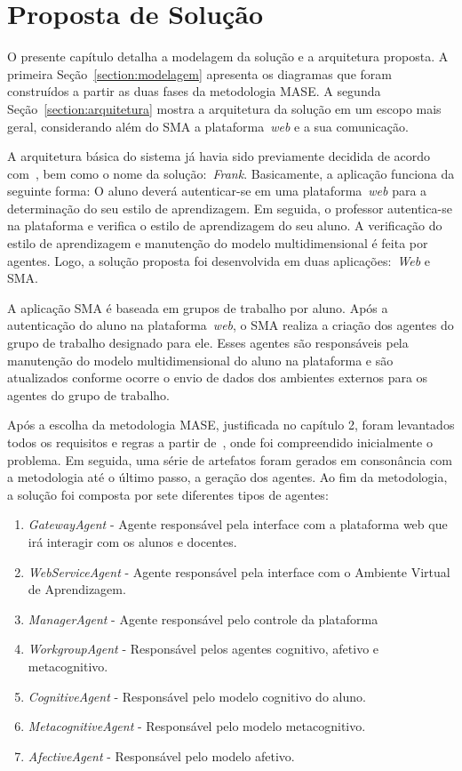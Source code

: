 \chapter{Proposta de Solução}

O presente capítulo detalha a modelagem da solução e a arquitetura proposta. A primeira Seção~\ref{section:modelagem} apresenta os diagramas que foram construídos a partir as duas fases da metodologia MASE. A segunda Seção~\ref{section:arquitetura} mostra a arquitetura da solução em um escopo mais geral, considerando além do SMA a plataforma~\emph{web} e a sua comunicação.

A arquitetura básica do sistema já havia sido previamente decidida de acordo com~\cite{editalFrank}, bem como o nome da solução:~\emph{Frank}. Basicamente, a aplicação funciona da seguinte forma: O aluno deverá autenticar-se em uma plataforma~\emph{web} para a determinação do seu estilo de aprendizagem. Em seguida, o professor autentica-se na plataforma e verifica o estilo de aprendizagem do seu aluno. A verificação do estilo de aprendizagem e manutenção do modelo multidimensional é feita por agentes. Logo, a solução proposta foi desenvolvida em duas aplicações:~\emph{Web} e SMA.

A aplicação SMA é baseada em grupos de trabalho por aluno. Após a autenticação do aluno na plataforma~\emph{web}, o SMA realiza a criação dos agentes do grupo de trabalho designado para ele. Esses agentes são responsáveis pela manutenção do modelo multidimensional do aluno na plataforma e são atualizados conforme ocorre o envio de dados dos ambientes externos para os agentes do grupo de trabalho.

Após a escolha da metodologia MASE, justificada no capítulo 2, foram levantados todos os requisitos e regras a partir de~\cite{editalFrank}, onde foi compreendido inicialmente o problema. Em seguida, uma série de artefatos foram gerados em consonância com a metodologia até o último passo, a geração dos agentes. Ao fim da metodologia, a solução foi composta por sete diferentes tipos de agentes:
\begin{enumerate}
	\item \emph{GatewayAgent} - Agente responsável pela interface com a plataforma web que irá interagir com os alunos e docentes.
	\item \emph{WebServiceAgent} - Agente responsável pela interface com o Ambiente Virtual de Aprendizagem.
	\item \emph{ManagerAgent} - Agente responsável pelo controle da plataforma
	\item \emph{WorkgroupAgent} - Responsável pelos agentes cognitivo, afetivo e metacognitivo.
	\item \emph{CognitiveAgent} - Responsável pelo modelo cognitivo do aluno.
	\item \emph{MetacognitiveAgent} - Responsável pelo modelo metacognitivo.
	\item \emph{AfectiveAgent} - Responsável pelo modelo afetivo.
\end{enumerate}

